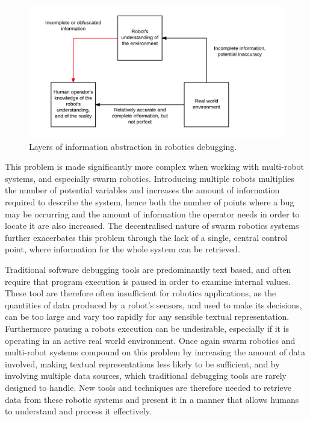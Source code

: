 \begin{figure}
	\centering
	\includegraphics{Figures/RobotDebuggingInformationAbstraction.png}
	\decoRule
	\caption[Debugging information abstraction diagram]{Layers of information abstraction in robotics debugging.}
	\label{fig:DebuggingInformation}
\end{figure}

This problem is made significantly more complex when working with multi-robot systems, and especially swarm robotics. Introducing multiple robots multiplies the number of potential variables and increases the amount of information required to describe the system, hence both the number of points where a bug may be occurring and the amount of information the operator needs in order to locate it are also increased. The decentralised nature of swarm robotics systems further exacerbates this problem through the lack of a single, central control point, where information for the whole system can be retrieved.

Traditional software debugging tools are predominantly text based, and often require that program execution is paused in order to examine internal values. These tool are therefore often insufficient for robotics applications, as the quantities of data produced by a robot's sensors, and used to make its decisions, can be too large and vary too rapidly for any sensible textual representation. Furthermore pausing a robots execution can be undesirable, especially if it is operating in an active real world environment. Once again swarm robotics  and multi-robot systems compound on this problem by increasing the amount of data involved, making textual representations less likely to be sufficient, and by involving multiple data sources, which traditional debugging tools are rarely designed to handle. New tools and techniques are therefore needed to retrieve data from these robotic systems and present it in a manner that allows humans to understand and process it effectively.

